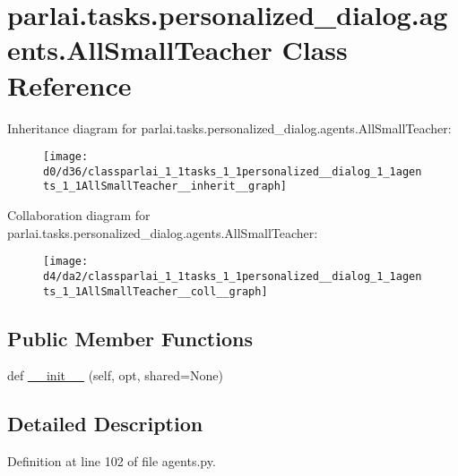 \hypertarget{classparlai_1_1tasks_1_1personalized__dialog_1_1agents_1_1AllSmallTeacher}{}\section{parlai.\+tasks.\+personalized\+\_\+dialog.\+agents.\+All\+Small\+Teacher Class Reference}
\label{classparlai_1_1tasks_1_1personalized__dialog_1_1agents_1_1AllSmallTeacher}


Inheritance diagram for parlai.\+tasks.\+personalized\+\_\+dialog.\+agents.\+All\+Small\+Teacher\+:
\nopagebreak
\begin{figure}[H]
\begin{center}
\leavevmode
\texttt{[image: d0/d36/classparlai\_1\_1tasks\_1\_1personalized\_\_dialog\_1\_1agents\_1\_1AllSmallTeacher\_\_inherit\_\_graph]}
\end{center}
\end{figure}


Collaboration diagram for parlai.\+tasks.\+personalized\+\_\+dialog.\+agents.\+All\+Small\+Teacher\+:
\nopagebreak
\begin{figure}[H]
\begin{center}
\leavevmode
\texttt{[image: d4/da2/classparlai\_1\_1tasks\_1\_1personalized\_\_dialog\_1\_1agents\_1\_1AllSmallTeacher\_\_coll\_\_graph]}
\end{center}
\end{figure}
\subsection*{Public Member Functions}
\begin{DoxyCompactItemize}
\item 
def \hyperlink{classparlai_1_1tasks_1_1personalized__dialog_1_1agents_1_1AllSmallTeacher_a1bb0f39431c43a72a244ae11cd3f1794}{\+\_\+\+\_\+init\+\_\+\+\_\+} (self, opt, shared=None)
\end{DoxyCompactItemize}


\subsection{Detailed Description}


Definition at line 102 of file agents.\+py.



